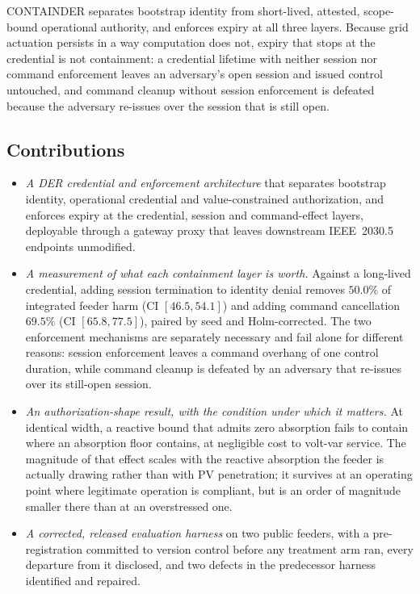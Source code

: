 CONTAINDER separates bootstrap identity from short-lived, attested, scope-bound operational
authority, and enforces expiry at all three layers. Because grid actuation persists in a way
computation does not, expiry that stops at the credential is not containment: a credential
lifetime with neither session nor command enforcement leaves an adversary's open session and
issued control untouched, and command cleanup without session enforcement is defeated because the
adversary re-issues over the session that is still open.

\subsection*{Contributions}
\begin{itemize}
\item \emph{A DER credential and enforcement architecture} that separates bootstrap identity,
operational credential and value-constrained authorization, and enforces expiry at the credential,
session and command-effect layers, deployable through a gateway proxy that leaves downstream
IEEE~2030.5 endpoints unmodified.

\item \emph{A measurement of what each containment layer is worth.} Against a long-lived
credential, adding session termination to identity denial removes $50.0\%$ of integrated feeder
harm (CI $[46.5, 54.1]$) and adding command cancellation $69.5\%$ (CI $[65.8, 77.5]$), paired by
seed and Holm-corrected. The two enforcement mechanisms are separately necessary and fail alone
for different reasons: session enforcement leaves a command overhang of one control duration,
while command cleanup is defeated by an adversary that re-issues over its still-open session.

\item \emph{An authorization-shape result, with the condition under which it matters.} At
identical width, a reactive bound that admits zero absorption fails to contain where an absorption
floor contains, at negligible cost to volt-var service. The magnitude of that effect scales with
the reactive absorption the feeder is actually drawing rather than with PV penetration; it
survives at an operating point where legitimate operation is compliant, but is an order of
magnitude smaller there than at an overstressed one.

\item \emph{A corrected, released evaluation harness} on two public feeders, with a
pre-registration committed to version control before any treatment arm ran, every departure from
it disclosed, and two defects in the predecessor harness identified and repaired.
\end{itemize}

